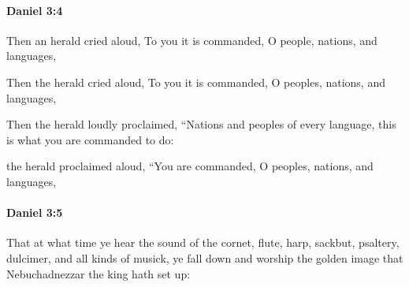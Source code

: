 		\paragraph{Daniel 3:4} %
			\label{DANIEL-3-4}

			Then an herald cried aloud, To you it is commanded, O people, nations, and languages,

			\begin{versebox}
					\item[BHS] 
					\item[LXX] 
					\item[ASV] Then the herald cried aloud, To you it is commanded, O peoples, nations, and languages,
					\item[NIV] Then the herald loudly proclaimed, “Nations and peoples of every language, this is what you are commanded to do:
					\item[NRSV] the herald proclaimed aloud, “You are commanded, O peoples, nations, and languages,
			\end{versebox}

		\paragraph{Daniel 3:5} %
			\label{DANIEL-3-5}

			That at what time ye hear the sound of the cornet, flute, harp, sackbut, psaltery, dulcimer, and all kinds of musick, ye fall down and worship the golden image that Nebuchadnezzar the king hath set up:

